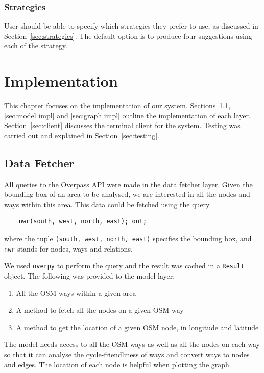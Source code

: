 \documentclass[12pt,a4paper]{report}
\begin{document}
\subsection{Strategies}
User should be able to specify which strategies they prefer to use, as discussed in Section~\ref{sec:strategies}. The default option is to produce four suggestions using each of the strategy.

\chapter{Implementation}\label{chapter:impl}
This chapter focuses on the implementation of our system. Sections~\ref{sec:data fetcher impl}, \ref{sec:model impl} and \ref{sec:graph impl} outline the implementation of each layer. Section~\ref{sec:client} discusses the terminal client for the system. Testing was carried out and explained in Section~\ref{sec:testing}.

\section{Data Fetcher}\label{sec:data fetcher impl}
All queries to the Overpass API were made in the data fetcher layer. Given the bounding box of an area to be analysed, we are interested in all the nodes and ways within this area. This data could be fetched using the query
\begin{verbatim}
    nwr(south, west, north, east); out;
\end{verbatim}
where the tuple \texttt{(south, west, north, east)} specifies the bounding box, and \texttt{nwr} stands for nodes, ways and relations.

We used \texttt{overpy} to perform the query and the result was cached in a \texttt{Result} object. The following was provided to the model layer:
\begin{enumerate}
    \item All the OSM ways within a given area
    \item A method to fetch all the nodes on a given OSM way
    \item A method to get the location of a given OSM node, in longitude and latitude
\end{enumerate}

The model needs access to all the OSM ways as well as all the nodes on each way so that it can analyse the cycle-friendliness of ways and convert ways to nodes and edges. The location of each node is helpful when plotting the graph.
\end{document}
